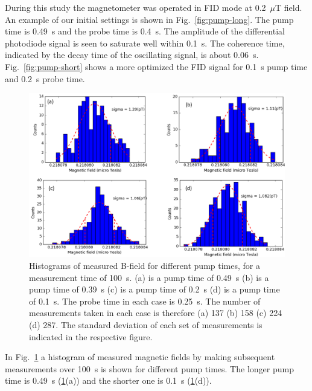 During this study the magnetometer was operated in FID mode at
0.2~$\mu$T field.
An example of our initial settings is shown in
Fig.~\ref{fig:pump-long}.  The pump time is 0.49~s and the probe time
is 0.4~s.  The amplitude of the differential photodiode signal is seen
to saturate well within 0.1~s.  The coherence time, indicated by the
decay time of the oscillating signal, is about 0.06~s.
Fig.~\ref{fig:pump-short} shows a more optimized the FID signal for
0.1~s pump time and 0.2~s probe time.
\begin{figure}%
  \centering\includegraphics[width=\linewidth]{figures/pump_time_}
  \caption{Histograms of measured B-field for different pump times, for a measurement time of 100~s.  (a) is a pump time of
      0.49~s (b) is a pump time of 0.39~s (c) is a pump time of 0.2~s
      (d) is a pump time of 0.1~s.  The probe time in each case is
      0.25~s.  The number of measurements taken in each case is
      therefore (a) 137 (b) 158 (c) 224 (d) 287.  The standard
      deviation of each set of measurements is indicated in the
      respective figure.}\label{fig:different-pump-time}
\end{figure}


In Fig.~\ref{fig:different-pump-time} a histogram of measured magnetic
fields by making subsequent measurements over 100~s is shown for
different pump times.  
  The longer pump time is 0.49~s (\ref{fig:different-pump-time}(a)) and the shorter one is 0.1~s (\ref{fig:different-pump-time}(d)). 

